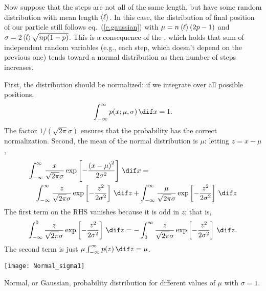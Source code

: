 Now suppose that the steps are not all of the same length, but have some random distribution with mean length $\left\langle\ell\right\rangle$. In this case, the distribution of final position of our particle still follows eq.~(\ref{e.gaussian}) with $\mu = n\left\langle\ell\right\rangle(2p-1)$ and $\sigma = 2\left\langle l\right\rangle\sqrt{np(1-p)}$. This is a consequence of the , which holds that sum of independent random variables (e.g., each step, which doesn't depend on the previous one) tends toward a normal distribution as then number of steps increases.

 First, the distribution should be normalized: if we integrate over all possible positions, 
\[ \int_{-\infty}^{\infty}p(x;\mu,\sigma)\,\dif x = 1. \]
The factor $1/(\sqrt{2\pi}\sigma)$ ensures that the probability has the correct normalization.
Second, the mean of the normal distribution is $\mu$: letting $z = x-\mu$,
\begin{eqnarray*}
\lefteqn{\int_{-\infty}^{\infty} \frac{x}{\sqrt{2\pi}\sigma} \exp\left[-\frac{\left(x-\mu\right)^{2}}{2\sigma^{2}}\right] \,\dif x = }  \\
	&& \int_{-\infty}^{\infty} \frac{z}{\sqrt{2\pi}\sigma} \exp\left[-\frac{z^{2}}{2\sigma^{2}}\right] \,\dif z + \int_{-\infty}^{\infty} \frac{\mu}{\sqrt{2\pi}\sigma} \exp\left[-\frac{z^{2}}{2\sigma^{2}}\right] \,\dif z 
\end{eqnarray*}
The first term on the RHS vanishes because it is odd in $z$; that is,
\[ 
	\int_{-\infty}^{0} \frac{z}{\sqrt{2\pi}\sigma} \exp\left[-\frac{z^{2}}{2\sigma^{2}}\right] \,\dif z = -\int_{0}^{\infty} \frac{z}{\sqrt{2\pi}\sigma} \exp\left[-\frac{z^{2}}{2\sigma^{2}}\right] \,\dif z.
\]
The second term is just $\mu \int_{-\infty}^{\infty} p(z)\,\dif z = \mu$.


\begin{marginfigure}
\texttt{[image: Normal\_sigma1]}
\caption[Normal distributions with different means]{Normal, or Gaussian, probability distribution for different values of $\mu$ with $\sigma=1$.}
\label{f.Normal-vary-mu}
\end{marginfigure}

